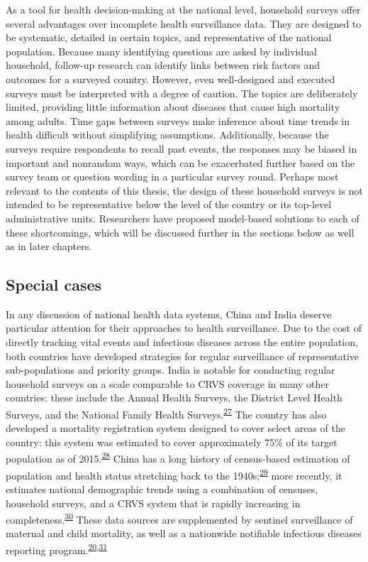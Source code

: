 \documentclass[
]{article}
\begin{document}
As a tool for health decision-making at the national level, household surveys offer several advantages over incomplete health surveillance data. They are designed to be systematic, detailed in certain topics, and representative of the national population. Because many identifying questions are asked by individual household, follow-up research can identify links between risk factors and outcomes for a surveyed country. However, even well-designed and executed surveys must be interpreted with a degree of caution. The topics are deliberately limited, providing little information about diseases that cause high mortality among adults. Time gaps between surveys make inference about time trends in health difficult without simplifying assumptions. Additionally, because the surveys require respondents to recall past events, the responses may be biased in important and nonrandom ways, which can be exacerbated further based on the survey team or question wording in a particular survey round. Perhaps most relevant to the contents of this thesis, the design of these household surveys is not intended to be representative below the level of the country or its top-level administrative units. Researchers have proposed model-based solutions to each of these shortcomings, which will be discussed further in the sections below as well as in later chapters.

\hypertarget{special-cases}{%
\subsection{Special cases}\label{special-cases}}

In any discussion of national health data systems, China and India deserve particular attention for their approaches to health surveillance. Due to the cost of directly tracking vital events and infectious diseases across the entire population, both countries have developed strategies for regular surveillance of representative sub-populations and priority groups. India is notable for conducting regular household surveys on a scale comparable to CRVS coverage in many other countries: these include the Annual Health Surveys, the District Level Health Surveys, and the National Family Health Surveys.\textsuperscript{\protect\hyperlink{ref-Dandona2016}{27}} The country has also developed a mortality registration system designed to cover select areas of the country: this system was estimated to cover approximately 75\% of its target population as of 2015.\textsuperscript{\protect\hyperlink{ref-Kumar2019}{28}} China has a long history of census-based estimation of population and health status stretching back to the 1940s;\textsuperscript{\protect\hyperlink{ref-Banister2004}{29}} more recently, it estimates national demographic trends using a combination of censuses, household surveys, and a CRVS system that is rapidly increasing in completeness.\textsuperscript{\protect\hyperlink{ref-Zeng2020}{30}} These data sources are supplemented by sentinel surveillance of maternal and child mortality, as well as a nationwide notifiable infectious diseases reporting program.\textsuperscript{\protect\hyperlink{ref-Vlieg2017}{20},\protect\hyperlink{ref-He2017}{31}}
\end{document}
